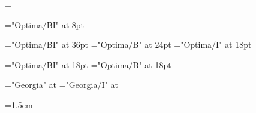 \def\displayfontname{Optima}
\def\bodyfontname{Georgia}
\newdimen\bodyfontsize \bodyfontsize=12pt
\newdimen\leading \leading=16pt
\normalbaselineskip=\leading

\def\makefont#1#2#3#4{\font#1="#2#4" at #3}

\def\makebodyfont#1#2{\makefont{#1}{\bodyfontname}{\bodyfontsize}{#2}}

\def\makedisplayfont#1#2#3{\makefont{#1}{\displayfontname}{#2}{#3}}

\makedisplayfont{\pageheaderfont}{8pt}{/BI}
\def\pagefooterfont{\pageheaderfont}

\makedisplayfont{\titlepagetitlefont}{36pt}{/BI}
\makedisplayfont{\titlepageauthorfont}{24pt}{/B}
\makedisplayfont{\titlepagepublisherfont}{18pt}{/I}

\makedisplayfont{\infopagetitlefont}{18pt}{/BI}
\makedisplayfont{\sectiontitlefont}{18pt}{/B}

\makebodyfont{\bodyrm}{}
\makebodyfont{\bodyit}{/I}

\def\leadin#1{{\leadinstyle#1}}
\def\leadinstyle{\noindent\bodyit}

\def\emph#1{{\bodyit #1}}

\normalbaselines
\raggedbottom
\bodyrm
\emergencystretch=1.5em
